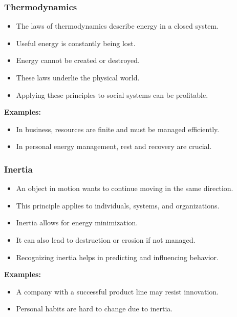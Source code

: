 \begin{frame}[fragile]\frametitle{Thermodynamics}
\begin{itemize}
    \item The laws of thermodynamics describe energy in a closed system.
    \item Useful energy is constantly being lost.
    \item Energy cannot be created or destroyed.
    \item These laws underlie the physical world.
    \item Applying these principles to social systems can be profitable.
\end{itemize}
\textbf{Examples:}
\begin{itemize}
    \item In business, resources are finite and must be managed efficiently.
    \item In personal energy management, rest and recovery are crucial.
\end{itemize}
\end{frame}

\begin{frame}[fragile]\frametitle{Inertia}
\begin{itemize}
    \item An object in motion wants to continue moving in the same direction.
    \item This principle applies to individuals, systems, and organizations.
    \item Inertia allows for energy minimization.
    \item It can also lead to destruction or erosion if not managed.
    \item Recognizing inertia helps in predicting and influencing behavior.
\end{itemize}
\textbf{Examples:}
\begin{itemize}
    \item A company with a successful product line may resist innovation.
    \item Personal habits are hard to change due to inertia.
\end{itemize}
\end{frame}

